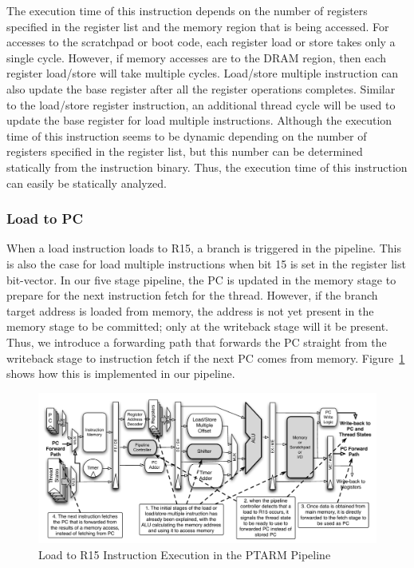 The execution time of this instruction depends on the number of registers specified in the register list and the memory region that is being accessed. 
For accesses to the scratchpad or boot code, each register load or store takes only a single cycle. 
However, if memory accesses are to the DRAM region, then each register load/store will take multiple cycles.
Load/store multiple instruction can also update the base register after all the register operations completes. 
Similar to the load/store register instruction, an additional thread cycle will be used to update the base register for load multiple instructions.
Although the execution time of this instruction seems to be dynamic depending on the number of registers specified in the register list, but this number can be determined statically from the instruction binary. 
Thus, the execution time of this instruction can easily be statically analyzed.   

\subsubsection{Load to PC}
\label{sec:load_to_pc}    
When a load instruction loads to R15, a branch is triggered in the pipeline.
This is also the case for load multiple instructions when bit 15 is set in the register list bit-vector.
In our five stage pipeline, the PC is updated in the memory stage to prepare for the next instruction fetch for the thread.   
However, if the branch target address is loaded from memory, the address is not yet present in the memory stage to be committed; only at the writeback stage will it be present. 
Thus, we introduce a forwarding path that forwards the PC straight from the writeback stage to instruction fetch if the next PC comes from memory. 
Figure~\ref{fig:ld_to_pc_pipeline_implementation} shows how this is implemented in our pipeline.   

\begin{figure}[h]
  
  \begin{center}
    \includegraphics[scale=.54]{figs/ld_to_pc_pipeline_implementation}
  \end{center}
  \vspace{-3mm}
  \caption{Load to R15 Instruction Execution in the PTARM Pipeline}
  \label{fig:ld_to_pc_pipeline_implementation}
\end{figure}

